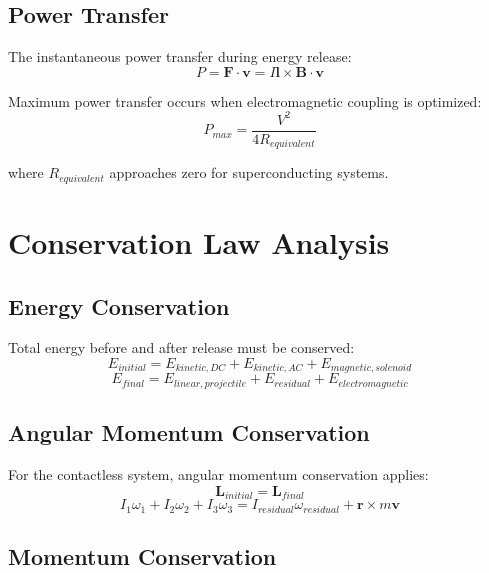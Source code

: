 \documentclass[12pt,a4paper]{article}
\begin{document}
\subsection{Power Transfer}

The instantaneous power transfer during energy release:
\begin{equation}
P = \mathbf{F} \cdot \mathbf{v} = I\mathbf{l} \times \mathbf{B} \cdot \mathbf{v}
\end{equation}

Maximum power transfer occurs when electromagnetic coupling is optimized:
\begin{equation}
P_{max} = \frac{V^2}{4R_{equivalent}}
\end{equation}

where $R_{equivalent}$ approaches zero for superconducting systems.

\section{Conservation Law Analysis}

\subsection{Energy Conservation}

Total energy before and after release must be conserved:
\begin{equation}
E_{initial} = E_{kinetic,DC} + E_{kinetic,AC} + E_{magnetic,solenoid}
\end{equation}
\begin{equation}
E_{final} = E_{linear,projectile} + E_{residual} + E_{electromagnetic}
\end{equation}

\subsection{Angular Momentum Conservation}

For the contactless system, angular momentum conservation applies:
\begin{equation}
\mathbf{L}_{initial} = \mathbf{L}_{final}
\end{equation}
\begin{equation}
I_1\omega_1 + I_2\omega_2 + I_3\omega_3 = I_{residual}\omega_{residual} + \mathbf{r} \times m\mathbf{v}
\end{equation}

\subsection{Momentum Conservation}
\end{document}
